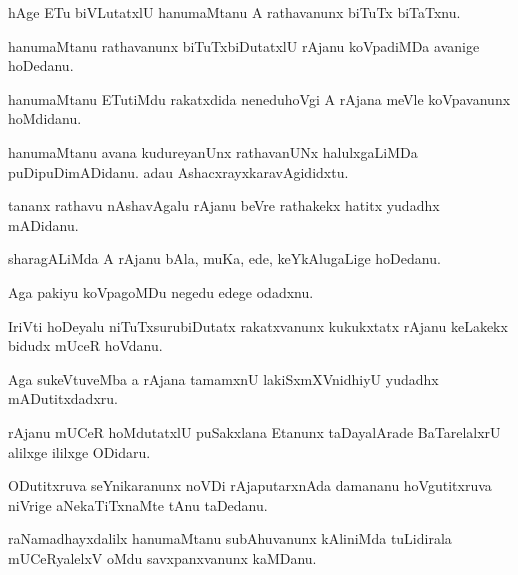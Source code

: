 \documentclass{article}
\begin{document}
\begin{mn}%
hAge ETu biVLutatxlU hanumaMtanu A rathavanunx biTuTx biTaTxnu.
\end{mn}

\begin{mn}%
hanumaMtanu rathavanunx biTuTxbiDutatxlU rAjanu koVpadiMDa avanige hoDedanu.
\end{mn}

\begin{mn}%
hanumaMtanu ETutiMdu rakatxdida neneduhoVgi A rAjana meVle koVpavanunx hoMdidanu.
\end{mn}

\begin{mn}%
hanumaMtanu avana kudureyanUnx rathavanUNx halulxgaLiMDa puDipuDimADidanu. adau 
AshacxrayxkaravAgididxtu.
\end{mn}

\begin{mn}%
tananx rathavu nAshavAgalu rAjanu beVre rathakekx hatitx yudadhx mADidanu.
\end{mn}

\begin{mn}%
sharagALiMda A rAjanu  bAla, muKa, ede, keYkAlugaLige hoDedanu.
\end{mn}

\begin{mn}%
Aga pakiyu koVpagoMDu negedu edege odadxnu. 
\end{mn}

\begin{mn}%
IriVti hoDeyalu niTuTxsurubiDutatx rakatxvanunx kukukxtatx rAjanu keLakekx bidudx mUceR 
hoVdanu.
\end{mn}

\begin{mn}%
Aga sukeVtuveMba a rAjana tamamxnU lakiSxmXVnidhiyU yudadhx mADutitxdadxru.
\end{mn}

\begin{mn}%
rAjanu mUCeR hoMdutatxlU puSakxlana Etanunx taDayalArade BaTarelalxrU alilxge ililxge 
ODidaru.
\end{mn}

\begin{mn}%
ODutitxruva seYnikaranunx noVDi rAjaputarxnAda damananu hoVgutitxruva niVrige 
aNekaTiTxnaMte tAnu taDedanu.
\end{mn}

\begin{mn}%
raNamadhayxdalilx hanumaMtanu subAhuvanunx kAliniMda tuLidirala mUCeRyalelxV oMdu 
savxpanxvanunx kaMDanu.
\end{mn}
\end{document}
